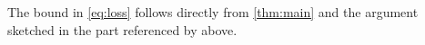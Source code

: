 The bound in \eqref{eq:loss} follows directly from \cref{thm:main} and the
argument sketched in the part referenced by  above.
